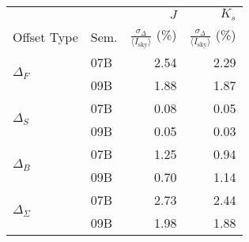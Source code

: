\begin{tabular}{ll|rr}
&  & $J$ & $K_s$ \\ %
Offset Type & Sem. & $\frac{\sigma_\Delta}{\langle I_\mathrm{sky}\rangle }$ (\%) & $\frac{\sigma_\Delta}{\langle I_\mathrm{sky}\rangle }$ (\%) \\
\hline
\multirow{2}{*}{$\Delta_F$} & 07B & 2.54 & 2.29 \\
& 09B  & 1.88 & 1.87 \\
\hline
\multirow{2}{*}{$\Delta_S$} & 07B & 0.08 & 0.05 \\
& 09B & 0.05 & 0.03 \\
\hline
\multirow{2}{*}{$\Delta_B$} & 07B & 1.25 & 0.94 \\
& 09B &  0.70 & 1.14 \\
\hline
\multirow{2}{*}{$\Delta_\Sigma$} & 07B  & 2.73 & 2.44 \\
& 09B & 1.98 & 1.88 \\
\end{tabular}
